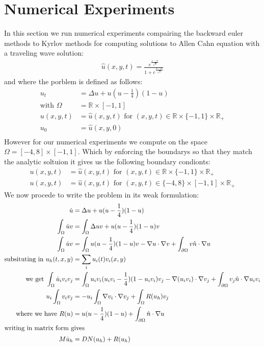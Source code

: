 \section{Numerical Experiments}

In this section we run numerical experiments compairing the backward euler methods to Kyrlov methods for computing solutions to Allen Cahn equation with a traveling wave solution\cite{YukitakaFukao2004}:
\begin{align}
    \hat u(x,y,t)=\frac{e^{\frac{x-ct}{\sqrt2}}}{1+e^{\frac{x-ct}{\sqrt2}}} \label{TravelingWaveSol}
\end{align}
and where the porblem is defined as follows:
\begin{align*}
    u_t&=\Delta u+u(u-\frac14)(1-u)\\
    \text{with } \Omega &= \mathbb{R}\times[-1,1]\\
    u(x,y,t) &= \hat u(x,y,t) \text{ for $(x,y,t) \in \mathbb{R}\times\{-1,1\}\times\mathbb{R}_+$}\\
    u_0 &= \hat u(x,y,0)\\
\end{align*}
However for our numerical experiments we compute on the space $\Omega=[-4,8]\times[-1,1]$.
Which by enforcing the boundarys so that they match the analytic soltuion it gives us the following boundary condionts:
\begin{align*}
    u(x,y,t) &= \hat u(x,y,t) \text{ for $(x,y,t) \in \mathbb{R}\times\{-1,1\}\times\mathbb{R}_+$}\\
    u(x,y,t) &= \hat u(x,y,t) \text{ for $(x,y,t) \in \{-4,8\}\times[-1,1]\times\mathbb{R}_+$}
\end{align*}
We now procede to write the problem in its weak formulation:
\begin{align*}
    \dot u&=\Delta u+u(u-\frac14)(1-u)\\
    \int_{\Omega} \dot u v &=\int_{\Omega} \Delta uv+u(u-\frac14)(1-u)v\\
    \int_{\Omega} \dot u v &=\int_{\Omega} u(u-\frac14)(1-u)v - \nabla u \cdot \nabla v + \int_{\partial\Omega}  v\hat n \cdot \nabla u\\
    \text{subsituting in } u_h(t,x,y) &= \sum_i u_i(t) v_i(x,y)\\
    \text{we get } \int_{\Omega} \dot u_i v_i v_j &=\int_{\Omega} u_iv_i(u_iv_i-\frac14)(1-u_iv_i)v_j - \nabla (u_iv_i) \cdot \nabla v_j + \int_{\partial\Omega}  v_j\hat n \cdot \nabla u_iv_i\\
    u_i\int_{\Omega}v_iv_j &= -u_i\int_{\Omega}\nabla v_i \cdot \nabla v_j + \int_{\Omega}R(u_h)v_j\\
    \text{where we have } R(u)&=u(u-\frac14)(1-u) + \int_{\partial\Omega}  \hat n \cdot \nabla u\\
    \intertext{writing in matrix form gives}
    M\dot u_h &= DN(u_h) + R(u_h)\\
\end{align*}

